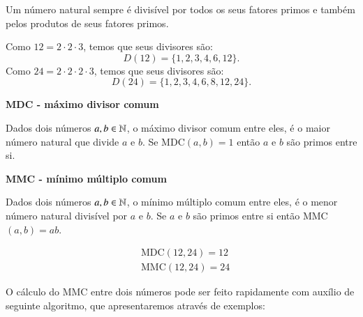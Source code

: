  \begin{obs}
 Um número natural sempre é divisível por todos os seus fatores primos e também pelos produtos de seus fatores primos.
 \end{obs}

 \begin{exem}
 Como $12= 2 \cdot 2 \cdot 3$, temos que seus divisores são: \[D(12)= \{1, 2, 3, 4, 6, 12\}.\]
 Como $24= 2 \cdot 2 \cdot 2 \cdot 3$, temos que seus divisores são: \[D(24)= \{1, 2, 3, 4, 6, 8, 12, 24\}.\]
 \end{exem}

 \vskip0.3cm
 \colorbox{azul}{
 \begin{minipage}{14.5cm}
 \begin{center}
  \textbf{MDC - máximo divisor comum}

  Dados dois números $a, b \in \mathbb{N}$, o máximo divisor comum entre eles, é o maior número natural que divide $a$ e $b$. Se MDC$(a, b)= 1$ então $a$ e $b$ são primos entre si.
 \end{center}
 \end{minipage}}

 \vskip0.3cm

 \colorbox{azul}{
 \begin{minipage}{14.5cm}
 \begin{center}
 \textbf{MMC - mínimo múltiplo comum}

 Dados dois números $a, b \in \mathbb{N}$, o mínimo múltiplo comum entre eles, é o menor número natural divisível por $a$ e $b$. Se $a$ e $b$ são primos entre si então MMC$(a, b)= ab$.
 \end{center}
 \end{minipage}}


 \begin{exem}
 \begin{align*}
 & \text{MDC}(12, 24)= 12 \\
 & \text{MMC}(12, 24)= 24
 \end{align*}
 \end{exem}

 O cálculo do MMC entre dois números pode ser feito rapidamente com auxílio de seguinte algoritmo, que apresentaremos através de exemplos:

